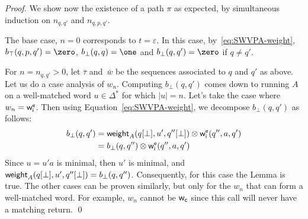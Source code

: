 \begin{proof}
\noindent
We show now the existence of a path $\pi$ as expected, %
by simultaneous induction on $n_{q, q'}$ and $n_{q, p, q'}$.

\noindent
The base case, $n = 0$ corresponds to $t = \varepsilon$. 
In this case, by~\eqref{eq:SWVPA-weight}, $b_\top(q, p, q') = \zero$,
$b_\bot(q, q) = \one$ and $b_\bot(q, q') = \zero$ if $q \neq q'$.

\noindent
For $n = n_{q, q'} > 0$, let $\bar\tau$ and~$\bar{w}$
be the sequences associated to $q$ and $q'$ as above.
Let us do a case analysis of $w_n$.
Computing $b_\bot(q, q')$ comes down to running $A$ on a well-matched word $u \in \Delta^*$ for which $|u| = n$. Let's take the case where $w_n  = \weiei$. Then using Equation~\ref{eq:SWVPA-weight}, we decompose $b_\bot(q, q')$ as follows:
\begin{align*}
b_\bot(q, q') &= \weight_A(\config{q}{\bot}, u', \config{q''}{\bot}) \otimes\weiei(q'', a, q') \\
&= b_\bot(q, q'')\otimes\weiei(q'', a, q')
\end{align*}
Since $u=u'a$ is minimal, then $u'$ is minimal, and $\mathsf{weight}_A(q[{\bot}], u', q''[{\bot}]) =b_\bot(q, q'')$. Consequently, for this case the Lemma is true. The other cases can be proven similarly,  but only for the $w_n$ that can form a well-matched word. For example, $w_n$ cannot be ${\mathsf{w}_\mathsf{c}}$ since this call will never have a matching return.
\qed
\end{proof}